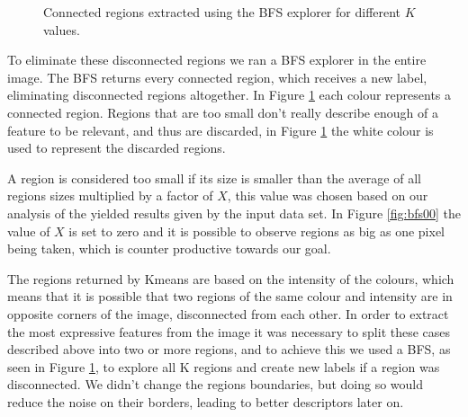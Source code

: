 \documentclass[12pt,a4paper]{article}
\begin{document}
\begin{figure}[!h]
{{		}
		\label{fig:bfs08}
	}
	\quad
	\caption{Connected regions extracted using the BFS explorer for different $K$ values.}
	\label{fig:bfs}
\end{figure}
	
	To eliminate these disconnected regions we ran a BFS explorer in the entire image. The BFS returns every connected region, which receives a new label, eliminating disconnected regions altogether. In Figure \ref{fig:bfs} each colour represents a connected region. Regions that are too small don't really describe enough of a feature to be relevant, and thus are discarded, in Figure \ref{fig:bfs} the white colour is used to represent the discarded regions.
	
	A region is considered too small if its size is smaller than the average of all regions sizes multiplied by a factor of $X$, this value was chosen based on our analysis of the yielded results given by the input data set. In Figure \ref{fig:bfs00} the value of $X$ is set to zero and it is possible to observe regions as big as one pixel being taken, which is counter productive towards our goal.

	The regions returned by Kmeans are based on the intensity of the colours, which means that it is possible that two regions of the same colour and intensity are in opposite corners of the image, disconnected from each other. In order to extract the most expressive features from the image it was necessary to split these cases described above into two or more regions, and to achieve this we used a BFS, as seen in Figure \ref{fig:bfs}, to explore all K regions and create new labels if a region was disconnected. We didn't change the regions boundaries, but doing so would reduce the noise on their borders, leading to better descriptors later on.
\end{document}
